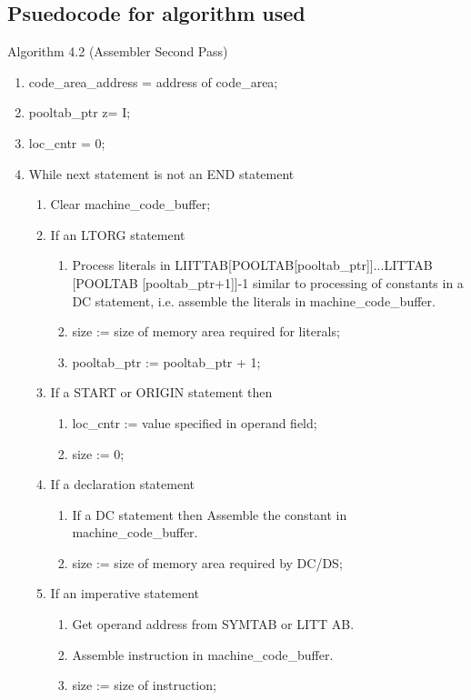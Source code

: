 \documentclass{scrreprt}
\begin{document}
\subsection{Psuedocode for algorithm used}
Algorithm 4.2 (Assembler Second Pass)
\begin{enumerate}
\item code_area_address = address of code_area;
\item[] pooltab_ptr z= I;
\item[] loc_cntr = 0;

\item While next statement is not an END statement
\begin{enumerate}
\item Clear machine_code_buffer;

\item If an LTORG statement
\begin{enumerate}
\item Process literals in LIITTAB[POOLTAB[pooltab_ptr]]...LITTAB
   [POOLTAB [pooltab_ptr+1]]-1 similar to processing of constants
in a DC statement, i.e. assemble the literals in machine_code_buffer.
\item size := size of memory area required for literals;
\item pooltab_ptr := pooltab_ptr + 1;
\end{enumerate}

\item If a START or ORIGIN statement then
\begin{enumerate}
\item  loc_cntr := value specified in operand field;
\item size := 0;
\end{enumerate}

\item If a declaration statement
\begin{enumerate}
\item  If a DC statement then
Assemble the constant in machine_code_buffer.
\item size := size of memory area required by DC/DS;
\end{enumerate}

\item If an imperative statement
\begin{enumerate}
\item  Get operand address from SYMTAB or LITT AB.
\item Assemble instruction in machine_code_buffer.
\item size := size of instruction;
\end{enumerate}


\end{enumerate}
\end{enumerate}
\end{document}
